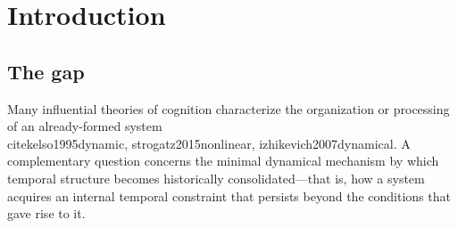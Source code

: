 \maketitle

\begin{abstract}
Biological and artificial adaptive systems can retain acquired temporal structure after the driving signal is altered or removed, but the minimal dynamical conditions for such persistence remain unclear. Here I show that, within a minimal class of delayed adaptive systems, cognitive inertia arises from the joint action of delayed self-coupling, delayed self-correlation accumulation, and threshold-gated structural consolidation. I formulate and analyze a conditional cognitive inertia theorem for this system class: the structural consolidation variable $\kappa_t$ enters a locked regime when the time-averaged delayed self-correlation exceeds a threshold; once locked, the residue-class phase configuration has a positive structural-preservation lower bound determined by the consolidated state and the maximum structural decay speed. Numerical simulations within this system class with $N=100$ independent seeds confirm that all three conditions are jointly necessary for persistence---removing any one eliminates persistence entirely. The theorem yields three experimentally testable predictions: phase preservation after stimulus omission, inertial drag under frequency perturbation, and frequency coexistence modulation when internal and external periods differ.
\end{abstract}

\section{Introduction}

\subsection{The gap}

Many influential theories of cognition characterize the organization or processing of an already-formed system \\cite{kelso1995dynamic, strogatz2015nonlinear, izhikevich2007dynamical}. A complementary question concerns the minimal dynamical mechanism by which temporal structure becomes historically consolidated---that is, how a system acquires an internal temporal constraint that persists beyond the conditions that gave rise to it.

